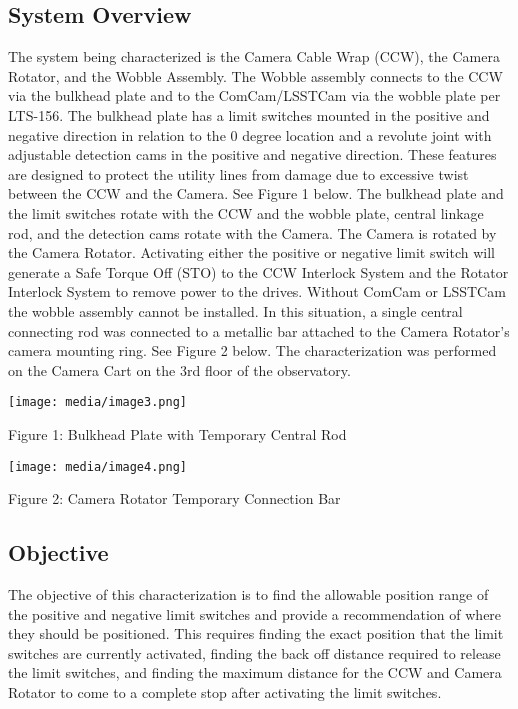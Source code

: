 \documentclass[SE,lsstdraft,authoryear,toc]{lsstdoc}
\begin{document}
\hypertarget{system-overview}{%
\subsection{System Overview}\label{system-overview}}

The system being characterized is the Camera Cable Wrap (CCW), the
Camera Rotator, and the Wobble Assembly. The Wobble assembly connects to
the CCW via the bulkhead plate and to the ComCam/LSSTCam via the wobble
plate per LTS-156. The bulkhead plate has a limit switches mounted in
the positive and negative direction in relation to the 0 degree location
and a revolute joint with adjustable detection cams in the positive and
negative direction. These features are designed to protect the utility
lines from damage due to excessive twist between the CCW and the Camera.
See Figure 1 below. The bulkhead plate and the limit switches rotate
with the CCW and the wobble plate, central linkage rod, and the
detection cams rotate with the Camera. The Camera is rotated by the
Camera Rotator. Activating either the positive or negative limit switch
will generate a Safe Torque Off (STO) to the CCW Interlock System and
the Rotator Interlock System to remove power to the drives. Without
ComCam or LSSTCam the wobble assembly cannot be installed. In this
situation, a single central connecting rod was connected to a metallic
bar attached to the Camera Rotator's camera mounting ring. See Figure 2
below. The characterization was performed on the Camera Cart on the 3rd
floor of the observatory.

\texttt{[image: media/image3.png]}

Figure 1: Bulkhead Plate with Temporary Central Rod

\texttt{[image: media/image4.png]}

Figure 2: Camera Rotator Temporary Connection Bar

\hypertarget{objective}{%
\subsection{Objective}\label{objective}}

The objective of this characterization is to find the allowable position
range of the positive and negative limit switches and provide a
recommendation of where they should be positioned. This requires finding
the exact position that the limit switches are currently activated,
finding the back off distance required to release the limit switches,
and finding the maximum distance for the CCW and Camera Rotator to come
to a complete stop after activating the limit switches.
\end{document}
